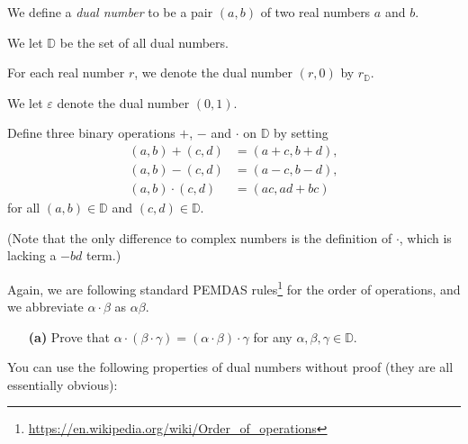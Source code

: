 \documentclass[paper=a4, fontsize=12pt]{scrartcl} %
\newcommand{\DD}{{\mathbb{D}}} %
\newcommand{\tup}[1]{\left( #1 \right)}
\newcommand{\eps}{\varepsilon}
\theoremstyle{plainsl}
\theoremstyle{definition}
\theoremstyle{remark}
\begin{document}
We define a \textit{dual number} to be a pair
$\tup{a, b}$ of two real numbers $a$ and $b$.

We let $\DD$ %
be the set of all dual numbers.

For each real number $r$, we denote the dual number
$\tup{r, 0}$ by $r_\DD$.

We let $\eps$ denote the dual number $\tup{0, 1}$.

Define three binary operations $+$, $-$ and $\cdot$
on $\DD$ by setting
\begin{align}
\tup{a, b} + \tup{c, d} &= \tup{a+c, b+d}, \\
\tup{a, b} - \tup{c, d} &= \tup{a-c, b-d}, \\
\tup{a, b} \cdot \tup{c, d} &= \tup{ac, ad+bc}
\end{align}
for all $\tup{a, b} \in \DD$ and $\tup{c, d} \in \DD$.

(Note that the only difference to complex numbers
is the definition of $\cdot$, which is lacking
a $-bd$ term.)

Again, we are following standard PEMDAS rules\footnote{
\url{https://en.wikipedia.org/wiki/Order_of_operations}} for
the order of operations, and we abbreviate $\alpha \cdot \beta$
as $\alpha \beta$.

\begin{enumerate}

\item[\textbf{(a)}]
Prove that
$\alpha \cdot \tup{\beta \cdot \gamma}
= \tup{\alpha \cdot \beta} \cdot \gamma$
for any $\alpha, \beta, \gamma \in \DD$.

\end{enumerate}

You can use the following properties of dual numbers
without proof (they are all essentially obvious):
\end{document}
